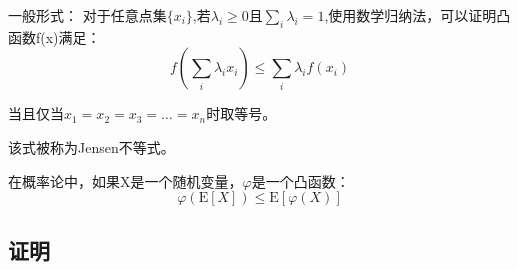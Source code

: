 \documentclass[a4paper]{article} %
\numberwithin{equation}{section} %
\begin{document}
一般形式：
对于任意点集$\{x_i\}$,若$\lambda_i\ge 0$且$\sum_i\lambda_i=1$,使用数学归纳法，可以证明凸函数f(x)满足：
\begin{equation}
f(\sum_i\lambda_ix_i)\le \sum_i\lambda_i f(x_i) \label{eq:jensen}
\end{equation}

当且仅当$x_1=x_2=x_3=\ldots=x_n$时取等号。

该式被称为Jensen不等式。

在概率论中，如果X是一个随机变量，$\varphi$是一个凸函数：
\begin{equation}
\varphi(\mathrm{E}[X])\le \mathrm{E}[\varphi(X)]
\end{equation}

\subsection{证明}
\end{document}

